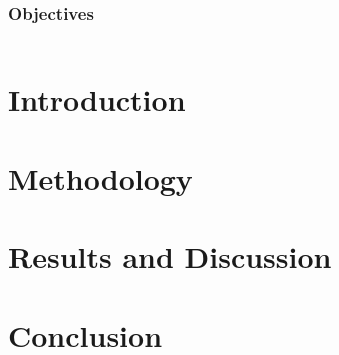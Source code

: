 \documentclass[aspectratio=169]{beamer} %
\begin{document}
{

{ \begin{frame}
\begin{flushright}
\frametitle{Objectives}
\end{flushright}


\begin{flushright}
    \begin{columns}
        \centering
        
        \centering
	      
    \end{columns}

\end{flushright}


\end{frame} }



\section{Introduction}
\section{Methodology}
\section{Results and Discussion}
\section{Conclusion}






}
\end{document}

